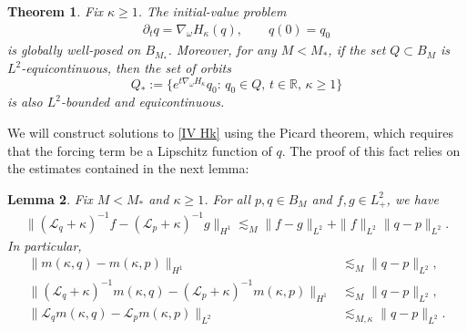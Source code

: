 \documentclass{amsart}
\numberwithin{equation}{section}
\newtheorem{theorem}{Theorem}[section]
\newtheorem{lemma}[theorem]{Lemma}
\theoremstyle{definition}
\newcommand{\om}{\omega}
\newcommand{\ka}{\kappa}
\newcommand{\R}{\mathbb{R}}
\newcommand{\Lc}{\mathcal{L}}
\newcommand{\na}{\nabla}
\newcommand{\dd}{\partial}
\begin{document}
\begin{theorem}\label{thm:GWP_ka}
Fix $\ka\geq1$. The initial-value problem
\begin{align}\label{IV Hk}
\dd_t q=\na_\om H_\ka(q),\qquad q(0)=q_0
\end{align}
is globally well-posed on $B_{M_*}$. Moreover, for any $M<M_*$, if the set $Q\subset B_M$ is $L^2$-equicontinuous, then the set of orbits
$$
Q_{\ast}:=\bigl\{e^{t\na_\om H_\ka}q_0:\,q_0\in Q,\, t\in \R,\,\ka\geq 1 \bigr\}
$$
is also $L^2$-bounded and equicontinuous.
\end{theorem}

We will construct solutions to \eqref{IV Hk} using the Picard theorem, which requires that the forcing term be a Lipschitz function of $q$.  The proof of this fact relies on the estimates contained in the next lemma:

\begin{lemma}\label{prop:H1_lipschitz}
Fix $M< M_\ast$ and $\ka\geq 1$. For all $p,q\in B_M$ and $f,g\in L^2_+$, we have
\begin{align}\label{8:49}
\|(\Lc_q+\ka)^{-1}f-(\Lc_p+\ka)^{-1}g\|_{H^1}\lesssim_M \|f-g\|_{L^2}+\|f\|_{L^2}\|q-p\|_{L^2}.
\end{align}
In particular,
\begin{align}
\|m(\ka,q)-m(\ka,p)\|_{H^1}&\lesssim_M\|q-p\|_{L^2}, \label{eqn:m_lipschitz} \\
\|(\Lc_q+\ka)^{-1} m(\ka,q)-(\Lc_p+\ka)^{-1} m(\ka,p)\|_{H^1}&\lesssim_M\|q-p\|_{L^2}, \label{eqn:H1_lipschitz3}\\
\|\Lc_q m(\ka,q)-\Lc_p m(\ka,p)\|_{L^2}&\lesssim_{M, \ka}\|q-p\|_{L^2}. \label{eqn:L2_lipschitz} 
\end{align}
\end{lemma}
\end{document}
